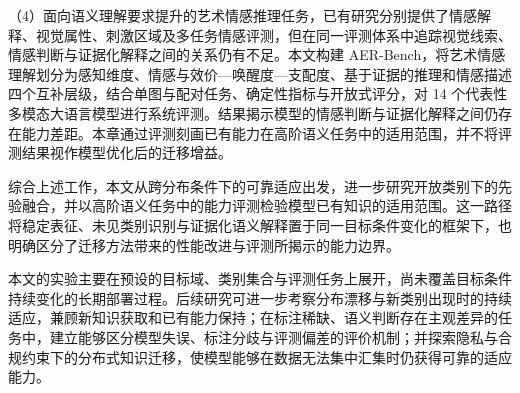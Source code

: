 \begin{conclusions}
（4）面向语义理解要求提升的艺术情感推理任务，已有研究分别提供了情感解释、视觉属性、刺激区域及多任务情感评测，但在同一评测体系中追踪视觉线索、情感判断与证据化解释之间的关系仍有不足。本文构建 AER-Bench，将艺术情感理解划分为感知维度、情感与效价—唤醒度—支配度、基于证据的推理和情感描述四个互补层级，结合单图与配对任务、确定性指标与开放式评分，对 14 个代表性多模态大语言模型进行系统评测。结果揭示模型的情感判断与证据化解释之间仍存在能力差距。本章通过评测刻画已有能力在高阶语义任务中的适用范围，并不将评测结果视作模型优化后的迁移增益。

综合上述工作，本文从跨分布条件下的可靠适应出发，进一步研究开放类别下的先验融合，并以高阶语义任务中的能力评测检验模型已有知识的适用范围。这一路径将稳定表征、未见类别识别与证据化语义解释置于同一目标条件变化的框架下，也明确区分了迁移方法带来的性能改进与评测所揭示的能力边界。

本文的实验主要在预设的目标域、类别集合与评测任务上展开，尚未覆盖目标条件持续变化的长期部署过程。后续研究可进一步考察分布漂移与新类别出现时的持续适应，兼顾新知识获取和已有能力保持；在标注稀缺、语义判断存在主观差异的任务中，建立能够区分模型失误、标注分歧与评测偏差的评价机制；并探索隐私与合规约束下的分布式知识迁移，使模型能够在数据无法集中汇集时仍获得可靠的适应能力。

\end{conclusions}
